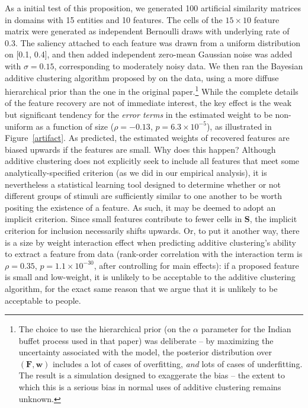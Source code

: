 \documentclass{apa}
\newcommand{\mat}[1]{\mathbf{#1}}
\begin{document}
As a initial test of this proposition, we generated 100 artificial similarity matrices in domains with 15 entities and 10 features. The cells of the $15 \times 10$ feature matrix were generated as independent Bernoulli draws with underlying rate of 0.3. The saliency attached to each feature was drawn from a uniform distribution on [0.1, 0.4], and then added independent zero-mean Gaussian noise was added with $\sigma =0.15$, corresponding to moderately noisy data. We then ran the Bayesian additive clustering algorithm proposed by  on the data, using a more diffuse hierarchical prior than the one in the original paper.\footnote{The choice to use the hierarchical prior (on the $\alpha$ parameter for the Indian buffet process used in that paper) was deliberate -- by maximizing the uncertainty associated with the model, the posterior distribution over $(\mat{F},\mat{w})$ includes a lot of cases of overfitting, {\it and} lots of cases of underfitting. The result is a simulation designed to exaggerate the bias -- the extent to which this is a serious bias in normal uses of additive clustering remains unknown.}
While the complete details of the feature recovery are not of immediate interest, the key effect is the weak but significant tendency for the {\it error terms} in the estimated weight to be non-uniform as a function of size ($\rho=-0.13$, $p=6.3\times10^{-5}$), as illustrated in Figure~\ref{artifact}. As predicted, the estimated weights of recovered features are biased upwards if the features are small. Why does this happen? Although additive clustering does not explicitly seek to include all features that meet some analytically-specified criterion (as we did in our empirical analysis), it is nevertheless a statistical learning tool designed to determine whether or not different groups of stimuli are sufficiently similar to one another to be worth positing the existence of a feature. As such, it may be deemed to adopt an implicit criterion. Since small features contribute to fewer cells in $\mat{S}$, the implicit criterion for inclusion necessarily shifts upwards. Or, to put it another way, there is a size by weight interaction effect when predicting additive clustering's ability to extract a feature from data (rank-order correlation with the interaction term is $\rho = 0.35$, $p = 1.1\times10^{-30}$, after controlling for main effects): if a proposed feature is small and low-weight, it is unlikely to be acceptable to the additive clustering algorithm, for the exact same reason that we argue that it is unlikely to be acceptable to people.
\end{document}
